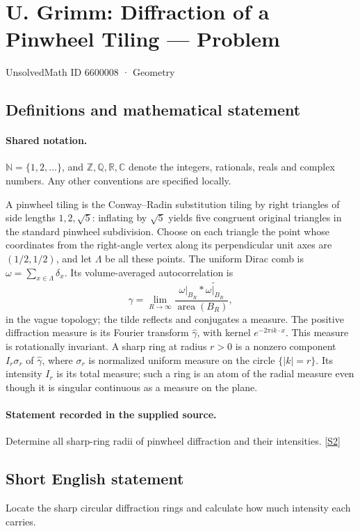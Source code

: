\documentclass[11pt]{article}
\newcommand{\sref}[2]{\hyperlink{source:#1:#2}{[S#2]}}
\begin{document}
\setcounter{section}{6600007}
\section{U. Grimm: Diffraction of a Pinwheel Tiling — Problem}\label{6600008}
{\small\sffamily UnsolvedMath ID 6600008 · Geometry}
\subsection{Definitions and mathematical statement}

\paragraph{Shared notation.}$\mathbb N=\{1,2,\ldots\}$, and $\mathbb Z,\mathbb Q,\mathbb R,\mathbb C$ denote the integers, rationals, reals and complex numbers. Any other conventions are specified locally.


A pinwheel tiling is the Conway--Radin substitution tiling by right triangles of side lengths $1,2,\sqrt5$: inflating by $\sqrt5$ yields five congruent original triangles in the standard pinwheel subdivision. Choose on each triangle the point whose coordinates from the right-angle vertex along its perpendicular unit axes are $(1/2,1/2)$, and let $\Lambda$ be all these points. The uniform Dirac comb is $\omega=\sum_{x\in\Lambda}\delta_x$. Its volume-averaged autocorrelation is
\[\gamma=\lim_{R\to\infty}\frac{\omega|_{B_R}*\widetilde{\omega|_{B_R}}}{\operatorname{area}(B_R)},\]
in the vague topology; the tilde reflects and conjugates a measure. The positive diffraction measure is its Fourier transform $\widehat\gamma$, with kernel $e^{-2\pi i k\cdot x}$. This measure is rotationally invariant. A sharp ring at radius $r>0$ is a nonzero component $I_r\sigma_r$ of $\widehat\gamma$, where $\sigma_r$ is normalized uniform measure on the circle $\{|k|=r\}$. Its intensity $I_r$ is its total measure; such a ring is an atom of the radial measure even though it is singular continuous as a measure on the plane.
\paragraph{Statement recorded in the supplied source.}
Determine all sharp-ring radii of pinwheel diffraction and their intensities. \sref{6600008}{2}
\subsection{Short English statement}
Locate the sharp circular diffraction rings and calculate how much intensity each carries.
\end{document}
